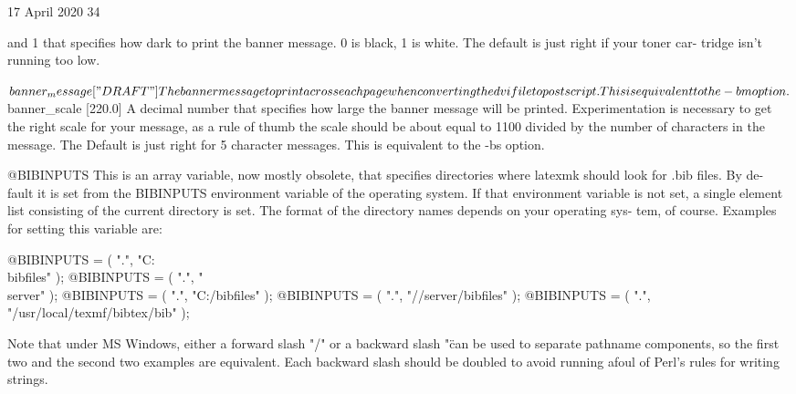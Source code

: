                                  17 April 2020                              34








              and  1 that specifies how dark to print the banner message. 0 is
              black, 1 is white.  The default is just right if your toner car-
              tridge isn't running too low.

       $banner_message ["DRAFT"]
              The banner message to print across each page when converting the
              dvi file to postscript.  This is equivalent to the -bm option.

       $banner_scale [220.0]
              A decimal number that specifies how  large  the  banner  message
              will  be printed.  Experimentation is necessary to get the right
              scale for your message, as a rule of thumb the scale  should  be
              about  equal  to 1100 divided by the number of characters in the
              message.  The Default is just right for  5  character  messages.
              This is equivalent to the -bs option.

       @BIBINPUTS
              This  is  an array variable, now mostly obsolete, that specifies
              directories where latexmk should look for .bib  files.   By  de-
              fault  it  is set from the BIBINPUTS environment variable of the
              operating system.  If that environment variable is  not  set,  a
              single  element list consisting of the current directory is set.
              The format of the directory names depends on your operating sys-
              tem, of course.  Examples for setting this variable are:

                      @BIBINPUTS = ( ".", "C:\\bibfiles" );
                      @BIBINPUTS = ( ".", "\\server\bibfiles" );
                      @BIBINPUTS = ( ".", "C:/bibfiles" );
                      @BIBINPUTS = ( ".", "//server/bibfiles" );
                      @BIBINPUTS = ( ".", "/usr/local/texmf/bibtex/bib" );

              Note  that  under  MS  Windows,  either a forward slash "/" or a
              backward slash "\" can be used to separate pathname  components,
              so  the  first  two  and the second two examples are equivalent.
              Each backward slash should be doubled to avoid running afoul  of
              Perl's rules for writing strings.

